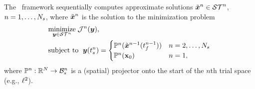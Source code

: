 The \methodAcronym\ framework sequentially computes approximate solutions
$\tilde{\boldsymbol x}^{n}\in\mathcal{ ST }^n$, $n=1,\ldots,N_s$, where 
$\tilde{\boldsymbol x}^{n}$ is the solution to the
minimization problem
\begin{equation}\label{eq:tclsrm}
\begin{split}
      &\underset{\boldsymbol y \in \mathcal{ ST }^n}{\text{minimize}} \; \mathcal{J}^n(\boldsymbol y), \\
			&\text{subject to } \;  \boldsymbol y(t_s^{n}) =
\begin{cases}\mathbb{P}^n (\tilde{\boldsymbol x}^{n-1}(t_f^{n-1})) & n = 2,\ldots,N_s \\
\mathbb{P}^n( {{\mathbf{x}}_0})& n=1, \end{cases} 
\end{split}
\end{equation}
where $\mathbb{P}^{n} : \mathbb{R}^{N} \rightarrow \mathcal{B}_{s}^{n}$ 
is a (spatial) projector onto the start of the $n$th trial space (e.g., $\ell^2$).


